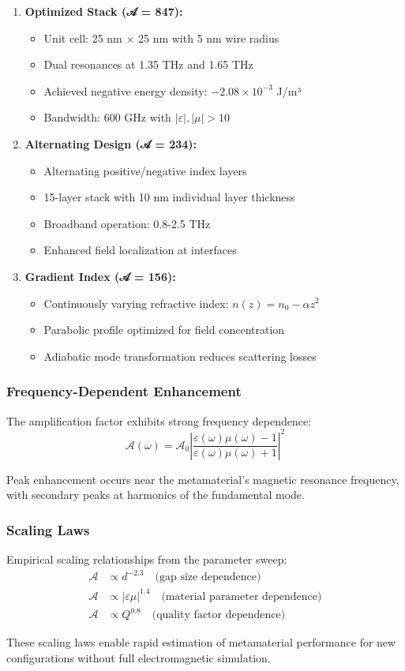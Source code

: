 \documentclass[11pt]{article}
\begin{document}
\begin{enumerate}
  \item \textbf{Optimized Stack (𝒜 = 847):}
    \begin{itemize}
      \item Unit cell: 25 nm × 25 nm with 5 nm wire radius
      \item Dual resonances at 1.35 THz and 1.65 THz
      \item Achieved negative energy density: $-2.08 \times 10^{-3}$ J/m³
      \item Bandwidth: 600 GHz with $|\varepsilon|, |\mu| > 10$
    \end{itemize}
  
  \item \textbf{Alternating Design (𝒜 = 234):}
    \begin{itemize}
      \item Alternating positive/negative index layers
      \item 15-layer stack with 10 nm individual layer thickness
      \item Broadband operation: 0.8-2.5 THz
      \item Enhanced field localization at interfaces
    \end{itemize}
  
  \item \textbf{Gradient Index (𝒜 = 156):}
    \begin{itemize}
      \item Continuously varying refractive index: $n(z) = n_0 - \alpha z^2$
      \item Parabolic profile optimized for field concentration
      \item Adiabatic mode transformation reduces scattering losses
    \end{itemize}
\end{enumerate}

\subsubsection*{Frequency-Dependent Enhancement}
The amplification factor exhibits strong frequency dependence:
\[
  \mathcal{A}(\omega) = \mathcal{A}_0 \left|\frac{\varepsilon(\omega)\mu(\omega) - 1}{\varepsilon(\omega)\mu(\omega) + 1}\right|^2
\]

Peak enhancement occurs near the metamaterial's magnetic resonance frequency, with secondary peaks at harmonics of the fundamental mode.

\subsubsection*{Scaling Laws}
Empirical scaling relationships from the parameter sweep:
\begin{align}
  \mathcal{A} &\propto d^{-2.3} \quad \text{(gap size dependence)} \\
  \mathcal{A} &\propto |\varepsilon\mu|^{1.4} \quad \text{(material parameter dependence)} \\
  \mathcal{A} &\propto Q^{0.8} \quad \text{(quality factor dependence)}
\end{align}

These scaling laws enable rapid estimation of metamaterial performance for new configurations without full electromagnetic simulation.
\end{document}
